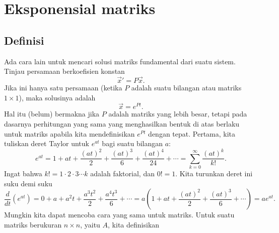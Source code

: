 
\sectionnewpage
\section{Eksponensial matriks} \label{sec:matexp}



\subsection{Definisi}

Ada cara lain untuk mencari solusi matriks fundamental
dari suatu sistem.
Tinjau persamaan berkoefisien konstan
\begin{equation*}
{\vec{x}}' = P \vec{x} .
\end{equation*}
Jika ini hanya satu persamaan (ketika $P$ adalah suatu bilangan atau matriks
$1 \times 1$), maka solusinya adalah
\begin{equation*}
\vec{x} = e^{Pt} .
\end{equation*}
Hal itu (belum) bermakna jika $P$ adalah matriks yang lebih besar, tetapi
pada dasarnya perhitungan yang sama yang menghasilkan bentuk di atas
berlaku untuk matriks apabila kita mendefinisikan
$e^{Pt}$ dengan tepat.  Pertama, kita tuliskan deret Taylor untuk $e^{at}$
bagi suatu bilangan $a$:
\begin{equation*}
e^{at} = 1 + at
+ \frac{{(at)}^2}{2}
+ \frac{{(at)}^3}{6}
+ \frac{{(at)}^4}{24}
+ \cdots
= \sum_{k=0}^\infty \frac{{(at)}^k}{k!} .
\end{equation*}
Ingat bahwa $k! = 1 \cdot 2 \cdot 3 \cdots k$ adalah faktorial, dan $0! = 1$.
Kita turunkan deret ini suku demi suku
\begin{equation*}
\frac{d}{dt} \left(e^{at} \right)
= 
0
+ a
+ a^2 t
+ \frac{a^3t^2}{2}
+ \frac{a^4t^3}{6}
+ \cdots
=
a \left(
1
+ a t
+ \frac{{(at)}^2}{2}
+ \frac{{(at)}^3}{6}
+ \cdots \right)
= a e^{at}.
\end{equation*}
Mungkin kita dapat mencoba cara yang sama untuk matriks.  Untuk suatu matriks
berukuran $n \times n$, yaitu $A$, kita definisikan
